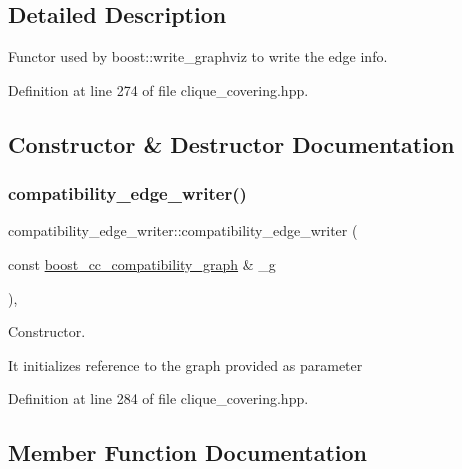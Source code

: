 \subsection{Detailed Description}
Functor used by boost\+::write\+\_\+graphviz to write the edge info. 

Definition at line 274 of file clique\+\_\+covering.\+hpp.



\subsection{Constructor \& Destructor Documentation}
\mbox{\label{classcompatibility__edge__writer_ad116a8610f2ffb7590aa6c07999e1ab2}} 
\subsubsection{\texorpdfstring{compatibility\+\_\+edge\+\_\+writer()}{compatibility\_edge\_writer()}}
{\footnotesize\ttfamily compatibility\+\_\+edge\+\_\+writer\+::compatibility\+\_\+edge\+\_\+writer (\begin{DoxyParamCaption}\item[{const \hyperlink{clique__covering__graph_8hpp_af47b1c28cf9a2c360afafb8d80582ce6}{boost\+\_\+cc\+\_\+compatibility\+\_\+graph} \&}]{\+\_\+g }\end{DoxyParamCaption})\hspace{0.3cm}{\ttfamily [inline]}, {\ttfamily [explicit]}}



Constructor. 

It initializes reference to the graph provided as parameter 

Definition at line 284 of file clique\+\_\+covering.\+hpp.



\subsection{Member Function Documentation}
\mbox{\label{classcompatibility__edge__writer_a9f2fdec3c7333198b4f43f8d12b0377e}} 
